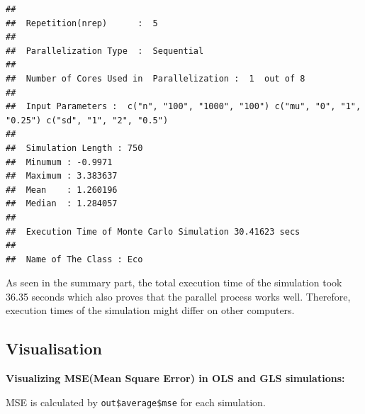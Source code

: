 \documentclass[11pt,a4paper]{article}
\begin{document}
\begin{verbatim}
## 
##  Repetition(nrep)      :  5 
## 
##  Parallelization Type  :  Sequential 
## 
##  Number of Cores Used in  Parallelization :  1  out of 8 
## 
##  Input Parameters :  c("n", "100", "1000", "100") c("mu", "0", "1", "0.25") c("sd", "1", "2", "0.5") 
## 
##  Simulation Length : 750 
##  Minumum : -0.9971 
##  Maximum : 3.383637 
##  Mean    : 1.260196 
##  Median  : 1.284057 
## 
##  Execution Time of Monte Carlo Simulation 30.41623 secs 
## 
##  Name of The Class : Eco
\end{verbatim}

As seen in the summary part, the total execution time of the simulation
took 36.35 seconds which also proves that the parallel process works
well. Therefore, execution times of the simulation might differ on other
computers.

\hypertarget{visualisation}{%
\subsection{Visualisation}\label{visualisation}}

\textbf{Visualizing MSE(Mean Square Error) in OLS and GLS simulations:}

MSE is calculated by \texttt{out\$average\$mse} for each simulation.
\end{document}

